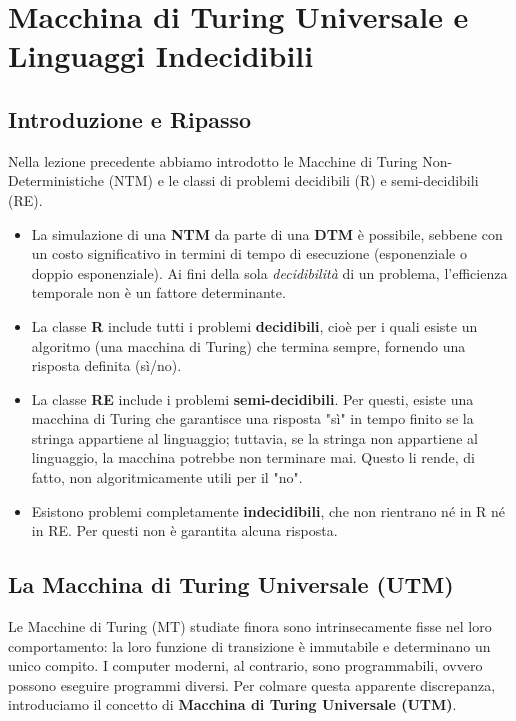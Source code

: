 \documentclass[a4paper, 11pt]{book} %
\theoremstyle{definition}
\begin{document}

\chapter{Macchina di Turing Universale e Linguaggi Indecidibili}



\section{Introduzione e Ripasso}

Nella lezione precedente abbiamo introdotto le Macchine di Turing Non-Deterministiche (NTM) e le classi di problemi decidibili (R) e semi-decidibili (RE).

\begin{itemize}
    \item La simulazione di una \textbf{NTM} da parte di una \textbf{DTM} è possibile, sebbene con un costo significativo in termini di tempo di esecuzione (esponenziale o doppio esponenziale). Ai fini della sola \textit{decidibilità} di un problema, l'efficienza temporale non è un fattore determinante.
    \item La classe \textbf{R} include tutti i problemi \textbf{decidibili}, cioè per i quali esiste un algoritmo (una macchina di Turing) che termina sempre, fornendo una risposta definita (sì/no).
    \item La classe \textbf{RE} include i problemi \textbf{semi-decidibili}. Per questi, esiste una macchina di Turing che garantisce una risposta "sì" in tempo finito se la stringa appartiene al linguaggio; tuttavia, se la stringa non appartiene al linguaggio, la macchina potrebbe non terminare mai. Questo li rende, di fatto, non algoritmicamente utili per il "no".
    \item Esistono problemi completamente \textbf{indecidibili}, che non rientrano né in R né in RE. Per questi non è garantita alcuna risposta.
\end{itemize}

\section{La Macchina di Turing Universale (UTM)}

Le Macchine di Turing (MT) studiate finora sono intrinsecamente fisse nel loro comportamento: la loro funzione di transizione è immutabile e determinano un unico compito. I computer moderni, al contrario, sono programmabili, ovvero possono eseguire programmi diversi. Per colmare questa apparente discrepanza, introduciamo il concetto di \textbf{Macchina di Turing Universale (UTM)}.
\end{document}
